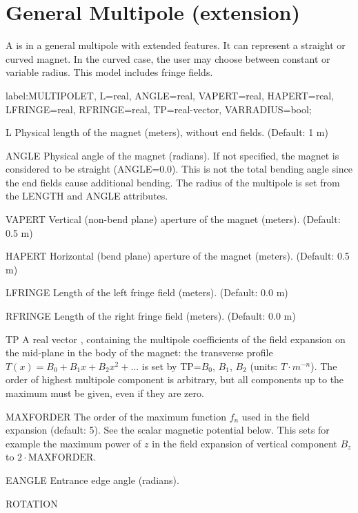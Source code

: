 \clearpage
\section{General Multipole (extension)}
\label{sec:multipoleT}
A  is in \opalt a general multipole with extended features. It can represent a straight or curved magnet. In the curved case, the user may choose between constant or variable radius. This model includes fringe fields. 
\begin{example}
label:MULTIPOLET, L=real, ANGLE=real, VAPERT=real, HAPERT=real,
      LFRINGE=real, RFRINGE=real, TP=real-vector, VARRADIUS=bool;
\end{example}
\begin{kdescription}
\item[L]
  Physical length of the magnet (meters), without end fields. (Default: 1 m)
\item[ANGLE]
  Physical angle of the magnet (radians). If not specified, the magnet is considered to be straight (ANGLE=0.0). This is not the total bending angle since the end fields cause additional bending. The radius of the multipole is set from the LENGTH and ANGLE attributes. 
\item[VAPERT]
  Vertical (non-bend plane) aperture of the magnet (meters). (Default: 0.5 m)
\item[HAPERT]
  Horizontal (bend plane) aperture of the magnet (meters). (Default: 0.5 m)
\item[LFRINGE]
  Length of the left fringe field (meters). (Default: 0.0 m)
\item[RFRINGE]
  Length of the right fringe field (meters). (Default: 0.0 m)
\item[TP]
  A real vector , containing the multipole coefficients of the field expansion on the mid-plane in the body of the magnet: the transverse profile $ T(x) = B_0 + B_1 x + B_2 x^2   + \dots $ is set by TP={$B_0$, $B_1$, $B_2$} (units: $ T \cdot m^{-n}$). The order of highest multipole component is arbitrary, but all components up to the maximum must be given, even if they are zero.
\item[MAXFORDER]
  The order of the maximum function $f_n$ used in the field expansion (default: 5). See the scalar magnetic potential below. This sets for example the maximum power of $z$ in the field expansion of vertical component $B_z$ to $2 \cdot \text{MAXFORDER} $.
\item[EANGLE]
  Entrance edge angle (radians).
\item[ROTATION]

\end{kdescription}

